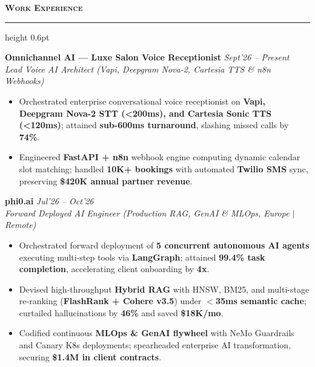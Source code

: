 \documentclass[10pt,a4paper]{article}
\newcommand{\resumesection}[1]{%
    \vspace{2.2pt}%
    {\color{burgundy}\scshape\bfseries\fontsize{9.0pt}{10.2pt}\selectfont #1}%
    \vspace{0.6pt}%
    \hrule height 0.6pt\relax%
    \vspace{1.6pt}%
}
\begin{document}
\noindent
\begin{minipage}[t]{0.488\textwidth}

    \resumesection{Work Experience}
    
    \noindent\textbf{Omnichannel AI --- Luxe Salon Voice Receptionist} \hfill {\footnotesize\textit{Sept'26 -- Present}}\\
    \textit{Lead Voice AI Architect (Vapi, Deepgram Nova-2, Cartesia TTS \& n8n Webhooks)}
    \begin{itemize}
        \item Orchestrated enterprise conversational voice receptionist on \textbf{Vapi, Deepgram Nova-2 STT (<200ms), and Cartesia Sonic TTS (<120ms)}; attained \textbf{sub-600ms turnaround}, slashing missed calls by \textbf{74\%}.
        \item Engineered \textbf{FastAPI + n8n} webhook engine computing dynamic calendar slot matching; handled \textbf{10K+ bookings} with automated \textbf{Twilio SMS} sync, preserving \textbf{\$420K annual partner revenue}.
    \end{itemize}

    \noindent\textbf{phi0.ai} \hfill {\footnotesize\textit{Jul'26 -- Oct'26}}\\
    \textit{Forward Deployed AI Engineer (Production RAG, GenAI \& MLOps, Europe $\vert$ Remote)}
    \begin{itemize}
        \item Orchestrated forward deployment of \textbf{5 concurrent autonomous AI agents} executing multi-step tools via \textbf{LangGraph}; attained \textbf{99.4\% task completion}, accelerating client onboarding by \textbf{4x}.
        \item Devised high-throughput \textbf{Hybrid RAG} with HNSW, BM25, and multi-stage re-ranking (\textbf{FlashRank + Cohere v3.5}) under \textbf{$<$35ms semantic cache}; curtailed hallucinations by \textbf{46\%} and saved \textbf{\$18K/mo}.
        \item Codified continuous \textbf{MLOps \& GenAI flywheel} with NeMo Guardrails and Canary K8s deployments; spearheaded enterprise AI transformation, securing \textbf{\$1.4M in client contracts}.
    \end{itemize}


\end{minipage}
\end{document}
